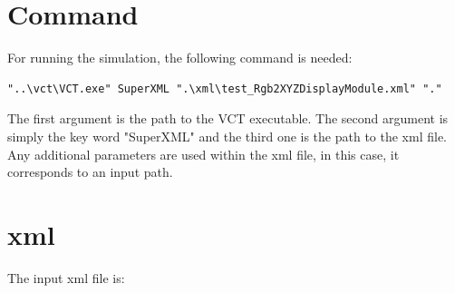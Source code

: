 \section{Command}

For running the simulation, the following command is needed:

\lstset{language=C++}
\begin{lstlisting}
"..\vct\VCT.exe" SuperXML ".\xml\test_Rgb2XYZDisplayModule.xml" "."
\end{lstlisting}

The first argument is the path to the VCT executable. The second argument is simply the key word "SuperXML" and the third one is the path to the xml file. Any additional parameters are used within the xml file, in this case, it corresponds to an input path.

\section{xml}

The input xml file is:

